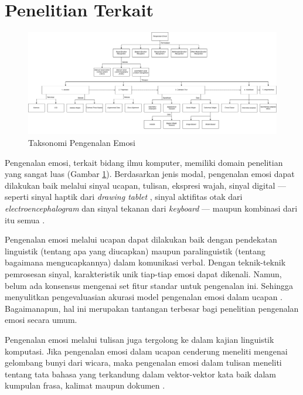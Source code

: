 \newpage
\section{Penelitian Terkait}
\begin{figure}[t]
    \centering
    \includegraphics[width=14cm]{gambar/taksonomi_pengenalan_emosi.png}
    \caption[Taksonomi Pengenalan Emosi]{Taksonomi Pengenalan Emosi \protect{}}
    \label{fig:taksonomiemosi}
\end{figure}
Pengenalan emosi, terkait bidang ilmu komputer, memiliki domain penelitian yang sangat luas (Gambar \ref{fig:taksonomiemosi}). Berdasarkan jenis modal, pengenalan emosi dapat dilakukan baik melalui sinyal ucapan, tulisan, ekspresi wajah, sinyal digital ---seperti sinyal haptik dari \textit{drawing tablet} , sinyal aktifitas otak dari \textit{electroencephalogram}  dan sinyal tekanan dari \textit{keyboard} --- maupun kombinasi dari itu semua .

Pengenalan emosi melalui ucapan dapat dilakukan baik dengan pendekatan linguistik (tentang apa yang diucapkan) maupun paralinguistik (tentang bagaimana mengucapkannya) dalam komunikasi verbal. Dengan teknik-teknik pemrosesan sinyal, karakteristik unik tiap-tiap emosi dapat dikenali. Namun, belum ada konsensus mengenai set fitur standar untuk pengenalan ini. Sehingga menyulitkan pengevaluasian akurasi model pengenalan emosi dalam ucapan . Bagaimanapun, hal ini merupakan tantangan terbesar bagi penelitian pengenalan emosi secara umum.

Pengenalan emosi melalui tulisan juga tergolong ke dalam kajian linguistik komputasi. Jika pengenalan emosi dalam ucapan cenderung meneliti mengenai gelombang bunyi dari wicara, maka pengenalan emosi dalam tulisan meneliti tentang tata bahasa yang terkandung dalam vektor-vektor kata baik dalam kumpulan frasa, kalimat maupun dokumen .

